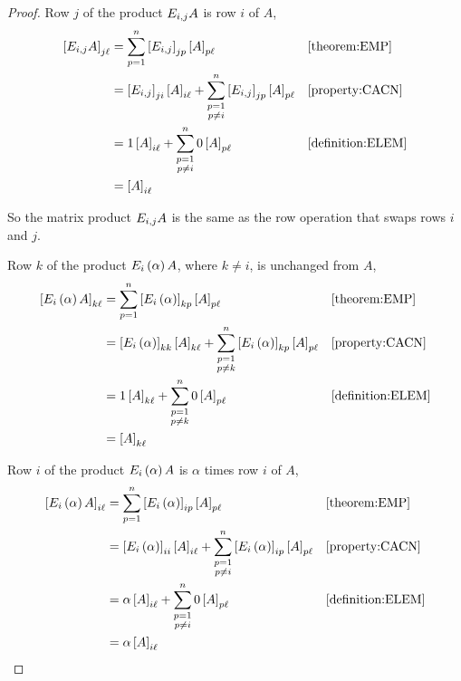 \documentclass{ximera}
\begin{document}
\begin{theorem}
\begin{proof}
  Row $j$ of the product  $E_{i,j}A$ is row $i$ of $A$,
  \begin{align*}
    \left\lbrack E_{i,j}A\right\rbrack_{j\ell}
    &=\sum_{p=1}^{n}\left\lbrack E_{i,j}\right\rbrack_{jp}\left\lbrack A\right\rbrack_{p\ell}
    &&\ref{theorem:EMP}\\
    &=\left\lbrack E_{i,j}\right\rbrack_{ji}\left\lbrack A\right\rbrack_{i\ell}+
      \sum_{\substack{p=1\\p\neq i}}^{n}\left\lbrack E_{i,j}\right\rbrack_{jp}\left\lbrack A\right\rbrack_{p\ell}
    &&\ref{property:CACN}\\
    &=1\left\lbrack A\right\rbrack_{i\ell}+\sum_{\substack{p=1\\p\neq i}}^{n}0\left\lbrack A\right\rbrack_{p\ell}
    &&\ref{definition:ELEM}\\
    &=\left\lbrack A\right\rbrack_{i\ell}
  \end{align*}
  
  So the matrix product $E_{i,j}A$ is the same as the row operation that swaps rows $i$ and $j$.

  Row $k$ of the product $E_{i}\left(\alpha\right)A$, where $k\neq i$, is unchanged from $A$,
  \begin{align*}
    \left\lbrack E_{i}\left(\alpha\right)A\right\rbrack_{k\ell}
    &=\sum_{p=1}^{n}\left\lbrack E_{i}\left(\alpha\right)\right\rbrack_{kp}\left\lbrack A\right\rbrack_{p\ell}
    &&\ref{theorem:EMP}\\
    &=\left\lbrack E_{i}\left(\alpha\right)\right\rbrack_{kk}\left\lbrack A\right\rbrack_{k\ell}+
      \sum_{\substack{p=1\\p\neq k}}^{n}\left\lbrack E_{i}\left(\alpha\right)\right\rbrack_{kp}\left\lbrack A\right\rbrack_{p\ell}
    &&\ref{property:CACN}\\
    &=1\left\lbrack A\right\rbrack_{k\ell}+\sum_{\substack{p=1\\p\neq k}}^{n}0\left\lbrack A\right\rbrack_{p\ell}
    &&\ref{definition:ELEM}\\
    &=\left\lbrack A\right\rbrack_{k\ell}
  \end{align*}

  Row $i$ of the product  $E_{i}\left(\alpha\right)A$ is $\alpha$ times row $i$ of $A$,
  \begin{align*}
    \left\lbrack E_{i}\left(\alpha\right)A\right\rbrack_{i\ell}
    &=\sum_{p=1}^{n}\left\lbrack E_{i}\left(\alpha\right)\right\rbrack_{ip}\left\lbrack A\right\rbrack_{p\ell}
    &&\ref{theorem:EMP}\\
    &=\left\lbrack E_{i}\left(\alpha\right)\right\rbrack_{ii}\left\lbrack A\right\rbrack_{i\ell}+
      \sum_{\substack{p=1\\p\neq i}}^{n}\left\lbrack E_{i}\left(\alpha\right)\right\rbrack_{ip}\left\lbrack A\right\rbrack_{p\ell}
    &&\ref{property:CACN}\\
    &=\alpha\left\lbrack A\right\rbrack_{i\ell}+\sum_{\substack{p=1\\p\neq i}}^{n}0\left\lbrack A\right\rbrack_{p\ell}
    &&\ref{definition:ELEM}\\
    &=\alpha\left\lbrack A\right\rbrack_{i\ell}
  \end{align*}
  

\end{proof}
\end{theorem}
\end{document}
